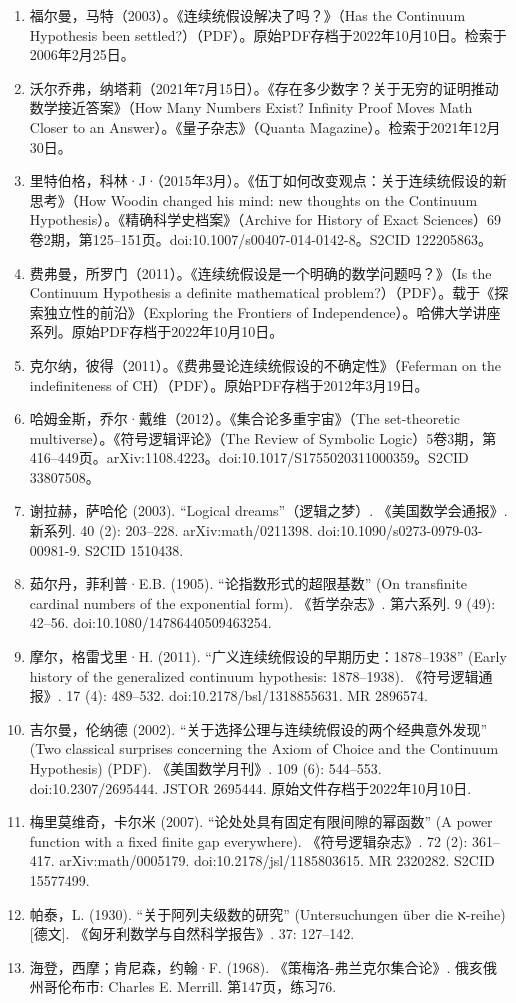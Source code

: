 \begin{enumerate}
\item 福尔曼，马特（2003）。《连续统假设解决了吗？》（Has the Continuum Hypothesis been settled?）（PDF）。原始PDF存档于2022年10月10日。检索于2006年2月25日。
\item 沃尔乔弗，纳塔莉（2021年7月15日）。《存在多少数字？关于无穷的证明推动数学接近答案》（How Many Numbers Exist? Infinity Proof Moves Math Closer to an Answer）。《量子杂志》（Quanta Magazine）。检索于2021年12月30日。
\item 里特伯格，科林·J·（2015年3月）。《伍丁如何改变观点：关于连续统假设的新思考》（How Woodin changed his mind: new thoughts on the Continuum Hypothesis）。《精确科学史档案》（Archive for History of Exact Sciences）69卷2期，第125–151页。doi:10.1007/s00407-014-0142-8。S2CID 122205863。
\item 费弗曼，所罗门（2011）。《连续统假设是一个明确的数学问题吗？》（Is the Continuum Hypothesis a definite mathematical problem?）（PDF）。载于《探索独立性的前沿》（Exploring the Frontiers of Independence）。哈佛大学讲座系列。原始PDF存档于2022年10月10日。
\item 克尔纳，彼得（2011）。《费弗曼论连续统假设的不确定性》（Feferman on the indefiniteness of CH）（PDF）。原始PDF存档于2012年3月19日。
\item 哈姆金斯，乔尔·戴维（2012）。《集合论多重宇宙》（The set-theoretic multiverse）。《符号逻辑评论》（The Review of Symbolic Logic）5卷3期，第416–449页。arXiv:1108.4223。doi:10.1017/S1755020311000359。S2CID 33807508。
\item 谢拉赫，萨哈伦 (2003). “Logical dreams”（逻辑之梦）. 《美国数学会通报》. 新系列. 40 (2): 203–228. arXiv:math/0211398. doi:10.1090/s0273-0979-03-00981-9. S2CID 1510438.
\item 茹尔丹，菲利普·E.B. (1905). “论指数形式的超限基数” (On transfinite cardinal numbers of the exponential form). 《哲学杂志》. 第六系列. 9 (49): 42–56. doi:10.1080/14786440509463254.
\item 摩尔，格雷戈里·H. (2011). “广义连续统假设的早期历史：1878–1938” (Early history of the generalized continuum hypothesis: 1878–1938). 《符号逻辑通报》. 17 (4): 489–532. doi:10.2178/bsl/1318855631. MR 2896574.
\item 吉尔曼，伦纳德 (2002). “关于选择公理与连续统假设的两个经典意外发现” (Two classical surprises concerning the Axiom of Choice and the Continuum Hypothesis) (PDF). 《美国数学月刊》. 109 (6): 544–553. doi:10.2307/2695444. JSTOR 2695444. 原始文件存档于2022年10月10日.
\item 梅里莫维奇，卡尔米 (2007). “论处处具有固定有限间隙的幂函数” (A power function with a fixed finite gap everywhere). 《符号逻辑杂志》. 72 (2): 361–417. arXiv:math/0005179. doi:10.2178/jsl/1185803615. MR 2320282. S2CID 15577499.
\item 帕泰，L. (1930). “关于阿列夫级数的研究” (Untersuchungen über die א-reihe) [德文]. 《匈牙利数学与自然科学报告》. 37: 127–142.
\item 海登，西摩；肯尼森，约翰·F. (1968). 《策梅洛-弗兰克尔集合论》. 俄亥俄州哥伦布市: Charles E. Merrill. 第147页，练习76.
\end{enumerate}
